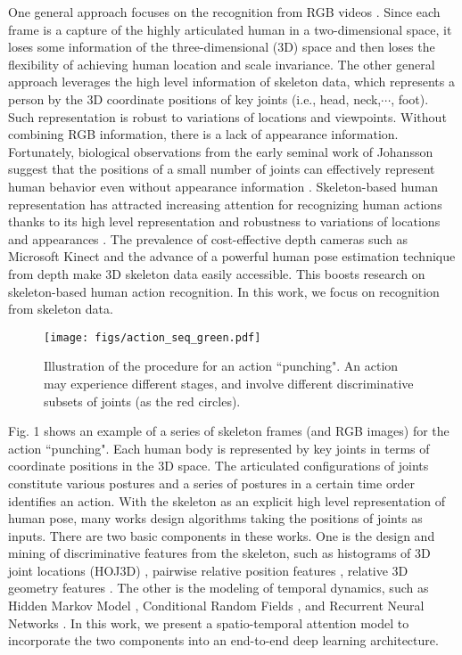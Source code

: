 \documentclass[letterpaper]{article}
\begin{document}
One general approach  focuses on the recognition from RGB videos \cite{CVIU11SurveyAction}. Since each frame is a capture of the highly articulated human in a two-dimensional space, it loses some information of the three-dimensional (3D) space and then loses the flexibility of achieving human location and scale invariance. The other general approach leverages the high level information of skeleton data, which represents a person by the 3D coordinate positions of key joints (i.e., head, neck,$\cdots$, foot). Such representation is robust to variations of locations and viewpoints. Without combining RGB information, there is a lack of appearance information. Fortunately, biological observations from the early seminal work of Johansson suggest that the positions of a small number of joints can effectively represent human behavior even without appearance information \cite{PP73Perception}. Skeleton-based human representation has attracted increasing attention for recognizing human actions thanks to its high level representation and robustness to variations of locations and appearances \cite{han2016space}. The prevalence of cost-effective depth cameras such as Microsoft Kinect \cite{zhang2012microsoft} and the advance of a powerful human pose estimation technique from depth \cite{Shotton2011} make 3D skeleton data easily accessible. This boosts  research on skeleton-based human action recognition. In this work, we focus on recognition from skeleton data.
\begin{figure}[t]
	\centering
	\texttt{[image: figs/action\_seq\_green.pdf]}
\vspace{-5mm}
	\caption{Illustration of the procedure for an action ``punching". An action may experience different stages, and involve different discriminative subsets of joints (as the red circles). }
\label{fig:skeleton}
\end{figure}


Fig. 1 shows an example of a series of skeleton frames (and RGB images) for the action ``punching". Each human body is represented by key joints in terms of coordinate positions in the 3D space. The articulated configurations of joints constitute various postures and a series of postures in a certain time order identifies an action. With the skeleton as an explicit high level representation of human pose, many works design algorithms taking the positions of joints as inputs. There are two basic components in these works. One is the design and mining of discriminative features from the skeleton, such as histograms of 3D joint locations (HOJ3D) \cite{CVPR12HO3DJ}, pairwise relative position features \cite{CVPR12Actionlet}, relative 3D geometry features \cite{vemulapalli2016r3dg}. The other is the modeling of temporal dynamics, such as Hidden Markov Model \cite{CVPR12HO3DJ}, Conditional Random Fields \cite{ICCV05CRF}, and Recurrent Neural Networks \cite{CVPR15HRNN}. In this work, we present a spatio-temporal attention model to incorporate the two components into an end-to-end deep learning architecture.
\end{document}
